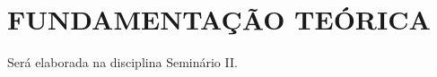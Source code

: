\section{FUNDAMENTAÇÃO TEÓRICA}
\label{sec:fundamentacao_teorica}

Será elaborada na disciplina Seminário II.